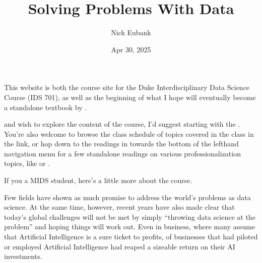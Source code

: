 \documentclass[letterpaper,10pt,english]{jupyterBook}
\title{Solving Problems With Data}
\date{Apr 30, 2025}
\author{Nick Eubank}
\begin{document}
\pagestyle{empty}
\sphinxmaketitle
\pagestyle{plain}
\sphinxtableofcontents
\pagestyle{normal}
\label{\detokenize{landing_page::doc}}


\sphinxAtStartPar
This website is both the course site for the Duke Interdisciplinary Data Science Course  (IDS 701), as well as the beginning of what I hope will eventually become a stand\sphinxhyphen{}alone textbook by .

\sphinxAtStartPar
{} and wish to explore the content of the course, I’d suggest starting with the {\hyperref[\detokenize{10_introduction/10_solving_problems_with_data::doc}]{}}. You’re also welcome to browse the class schedule of topics covered in the class in the {\hyperref[\detokenize{00_class_schedule/class_schedule::doc}]{}} link, or hop down to the readings in  towards the bottom of the left\sphinxhyphen{}hand navigation menu for a few stand\sphinxhyphen{}alone readings on various professionalization topics, like {\hyperref[\detokenize{40_in_practice/25_writing_to_stakeholders::doc}]{}} or {\hyperref[\detokenize{40_in_practice/30_giving_feedback::doc}]{}}.

\sphinxAtStartPar
If you  a MIDS student, here’s a little more about the course.

\begin{DUlineblock}{0em}
\item[] 
\end{DUlineblock}

\sphinxAtStartPar
Few fields have shown as much promise to address the world’s problems as data science. At the same time, however, recent years have also made clear that today’s global challenges will not be met by simply “throwing data science at the problem” and hoping things will work out. Even in business, where many assume that Artificial Intelligence is a sure ticket to profits,  of businesses that had piloted or employed Artificial Intelligence had reaped a sizeable return on their AI investments.
\end{document}

